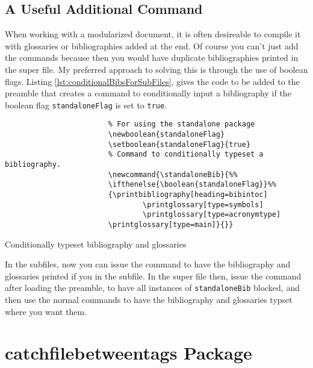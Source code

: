 \documentclass[hidelinks, float=false, crop=false]{standalone}
\begin{document}
        \subsection{A Useful Additional Command}
            When working with a modularized document, it is often desireable to compile it with glossaries or bibliographies added at the end.
            Of course you can't just add the commands \texttt{\printbibliography} because then you would have duplicate bibliographies printed in the super file.
            My preferred approach to solving this is through the use of boolean flags.
            Listing \ref{lst:conditionalBibsForSubFiles}, gives the code to be added to the preamble that creates a command to conditionally input a bibliography if the boolean flag \texttt{standaloneFlag} is set to \texttt{true}.
            \begin{listing}[H]
                \begin{centering}
                    \begin{verbatim}
                        % For using the standalone package
                        \newboolean{standaloneFlag}
                        \setboolean{standaloneFlag}{true}
                        % Command to conditionally typeset a bibliography.
                        \newcommand{\standaloneBib}{%%
                        \ifthenelse{\boolean{standaloneFlag}}%%
                        {\printbibliography[heading=bibintoc]
                                \printglossary[type=symbols]
                                \printglossary[type=acronymtype]
                        \printglossary[type=main]}{}}
                    \end{verbatim}
                    \caption{Conditionally typeset bibliography and glossaries}
                    \label{lst:conditionalBibsForSubFiles}
                \end{centering}
            \end{listing}
            In the subfiles, now you can issue the command \texttt{\standaloneBib} to have the bibliography and glossaries printed if you in the subfile.
            In the super file then, issue the command \texttt{} after loading the preamble, to have all instances of \texttt{standaloneBib} blocked, and then use the normal commands to have the bibliography and glossaries typset where you want them.


    \section{catchfilebetweentags Package}
\end{document}

